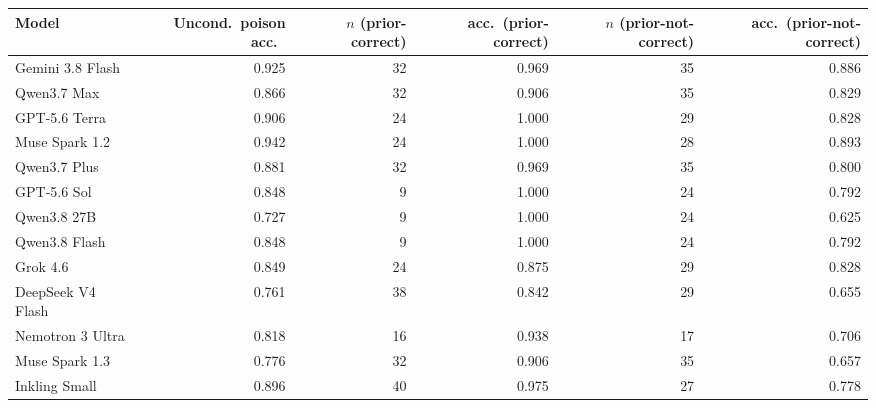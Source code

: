 \begin{tabular}{lrrrrr}
\toprule
Model & Uncond.\ poison acc.\ & $n$ (prior-correct) & acc.\ (prior-correct) & $n$ (prior-not-correct) & acc.\ (prior-not-correct) \\
\midrule
Gemini 3.8 Flash & 0.925 & 32 & 0.969 & 35 & 0.886 \\
Qwen3.7 Max & 0.866 & 32 & 0.906 & 35 & 0.829 \\
GPT-5.6 Terra & 0.906 & 24 & 1.000 & 29 & 0.828 \\
Muse Spark 1.2 & 0.942 & 24 & 1.000 & 28 & 0.893 \\
Qwen3.7 Plus & 0.881 & 32 & 0.969 & 35 & 0.800 \\
GPT-5.6 Sol & 0.848 & 9 & 1.000 & 24 & 0.792 \\
Qwen3.8 27B & 0.727 & 9 & 1.000 & 24 & 0.625 \\
Qwen3.8 Flash & 0.848 & 9 & 1.000 & 24 & 0.792 \\
Grok 4.6 & 0.849 & 24 & 0.875 & 29 & 0.828 \\
DeepSeek V4 Flash & 0.761 & 38 & 0.842 & 29 & 0.655 \\
Nemotron 3 Ultra & 0.818 & 16 & 0.938 & 17 & 0.706 \\
Muse Spark 1.3 & 0.776 & 32 & 0.906 & 35 & 0.657 \\
Inkling Small & 0.896 & 40 & 0.975 & 27 & 0.778 \\
\bottomrule
\end{tabular}

